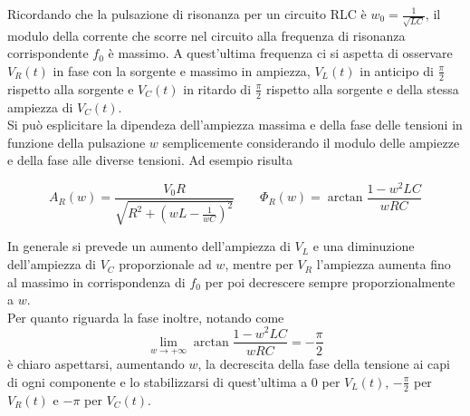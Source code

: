 \documentclass{article}
\begin{document}
Ricordando che la pulsazione di risonanza per un circuito RLC è $w_0=\frac{1}{\sqrt{LC}}$, il modulo della corrente che scorre nel circuito alla frequenza di risonanza corrispondente $f_0$ è massimo. A quest'ultima frequenza ci si aspetta di 
osservare $V_R(t)$ in fase con la sorgente e massimo in ampiezza, $V_L(t)$ in anticipo di $\frac{\pi}{2}$ rispetto alla sorgente e $V_C(t)$ in ritardo di $\frac{\pi}{2}$ rispetto alla sorgente e della stessa ampiezza di  $V_C(t)$. \\
Si può esplicitare la dipendeza dell'ampiezza massima e della fase delle tensioni in funzione della pulsazione $w$ semplicemente considerando il modulo delle ampiezze e della fase alle diverse tensioni. Ad esempio risulta

\begin{equation}
 A_R(w) =\frac{V_{0}R}{\sqrt{R^2+(wL-\frac{1}{wC})^2}} \qquad \Phi_R(w)=\arctan{\frac{1-w^2LC}{wRC}}
\end{equation}






In generale si prevede
un aumento dell'ampiezza di $V_L$ e una diminuzione dell'ampiezza di $V_C$ proporzionale ad $w$, mentre per $V_R$ l'ampiezza aumenta fino al massimo in corrispondenza di $f_0$ per poi decrescere sempre proporzionalmente a $w$. \\Per quanto riguarda la fase inoltre, notando come 
\begin{equation}
  \lim_{w \to + \infty}\arctan{\frac{1-w^2LC}{wRC}} = -\frac{\pi}{2}
\end{equation}
è chiaro aspettarsi, aumentando $w$, la decrescita della fase della tensione ai capi di ogni componente e lo stabilizzarsi di quest'ultima a 0 per $V_L(t)$, $-\frac{\pi}{2}$ per $V_R(t)$ e $-\pi$ per $V_C(t)$.
\end{document}
